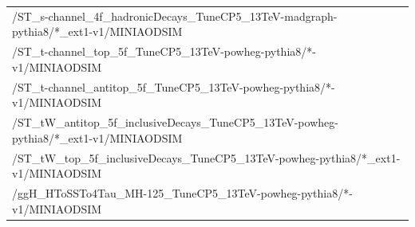 \begin{table}[htb]
\begin{center}
\begin{tabular}{l}
      /ST\_s-channel\_4f\_hadronicDecays\_TuneCP5\_13TeV-madgraph-pythia8/*\_ext1-v1/MINIAODSIM \\
      /ST\_t-channel\_top\_5f\_TuneCP5\_13TeV-powheg-pythia8/*-v1/MINIAODSIM \\
      /ST\_t-channel\_antitop\_5f\_TuneCP5\_13TeV-powheg-pythia8/*-v1/MINIAODSIM \\
      /ST\_tW\_antitop\_5f\_inclusiveDecays\_TuneCP5\_13TeV-powheg-pythia8/*\_ext1-v1/MINIAODSIM \\
      /ST\_tW\_top\_5f\_inclusiveDecays\_TuneCP5\_13TeV-powheg-pythia8/*\_ext1-v1/MINIAODSIM \\
      \hline
      /ggH\_HToSSTo4Tau\_MH-125\_TuneCP5\_13TeV-powheg-pythia8/*-v1/MINIAODSIM\\
      \hline
    \end{tabular}
    \label{tab:18samplesummary}
  \end{center}
\end{table}



